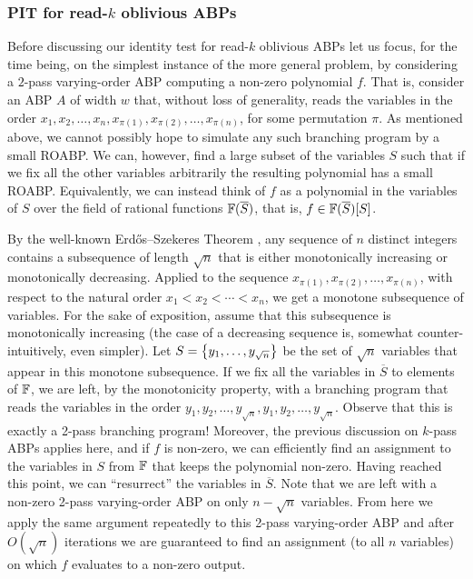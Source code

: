 \documentclass[11pt]{article}
\begin{document}

\subsubsection{PIT for read-$k$ oblivious ABPs}

Before discussing our identity test for read-$k$ oblivious ABPs let us focus, for the time being, on the simplest instance of the more general problem, by considering a $2$-pass varying-order ABP computing a non-zero polynomial $f$.
That is, consider an ABP $A$ of width $w$ that, without loss of generality, reads the variables in the order
$x_1, x_2, \ldots, x_n, x_{\pi(1)}, x_{\pi(2)},\ldots, x_{\pi(n)}$,
for some permutation $\pi$.
As mentioned above, we cannot possibly hope to simulate any such branching program by a small ROABP.
We can, however, find a large subset of the variables $S$ such that if we fix all the other variables arbitrarily the resulting polynomial has a small ROABP.
Equivalently, we can instead think of $f$ as a polynomial in the variables of $S$ over the field of rational functions $\F(\overline{S})$, that is, $f \in \F(\overline{S})[S]$. 


By the well-known Erd\H{o}s--Szekeres Theorem \cite{ES35}, any sequence of $n$ distinct integers contains a subsequence of length $\sqrt{n}$ that is either monotonically increasing or monotonically decreasing.
Applied to the sequence $x_{\pi(1)}, x_{\pi(2)},\ldots, x_{\pi(n)}$, with respect to the natural order $x_1 < x_2 < \cdots < x_n$, we get a monotone subsequence of variables.  For the sake of exposition, assume that this subsequence is monotonically increasing (the case of a decreasing sequence is, somewhat counter-intuitively, even simpler).
Let $S=\left\{ y_1, \ldots, y_{\sqrt{n}} \right\}$ be the set of $\sqrt{n}$ variables that appear in this monotone subsequence.
If we fix all the variables in $\overline{S}$ to elements of $\F$, we are left, by the monotonicity property, with a branching program that reads the variables in the order $y_1, y_2, \ldots, y_{\sqrt{n}}, y_{1}, y_{2},\ldots, y_{\sqrt{n}}.$
Observe that this is exactly a 2-pass branching program!
Moreover, the previous discussion on $k$-pass ABPs applies here, and if $f$ is non-zero, we can efficiently find an assignment to the variables in $S$ from $\F$ that keeps the polynomial non-zero.
Having reached this point, we can ``resurrect'' the variables in $\overline{S}$.  Note that we are left with a non-zero 2-pass varying-order ABP on only $n-\sqrt{n}$ variables.
From here we apply the same argument repeatedly to this 2-pass varying-order ABP and after $O(\sqrt{n})$ iterations we are guaranteed to find an assignment (to all $n$ variables) on which $f$ evaluates to a non-zero output.
\end{document}
